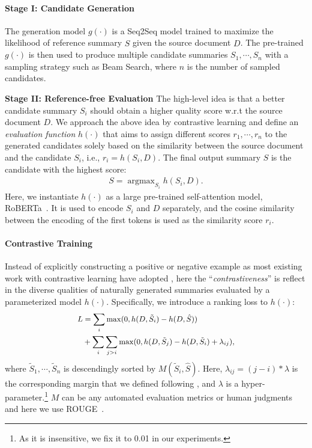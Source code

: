 \documentclass[11pt,a4paper]{article}
\DeclareMathOperator*{\argmax}{argmax}
\begin{document}
\paragraph{Stage I: Candidate Generation}
The generation model $g(\cdot)$ is a Seq2Seq model trained to maximize the likelihood of reference summary $\hat{S}$ given the source document $D$.
The pre-trained $g(\cdot)$ is then used to produce multiple candidate summaries $S_1, \cdots, S_n$ with a sampling strategy such as Beam Search, where $n$ is the number of sampled candidates.

\noindent\textbf{Stage II: Reference-free Evaluation}
The high-level idea is that a better candidate summary $S_i$ should obtain a higher quality score w.r.t the source document $D$.
We approach the above idea by contrastive learning and define an \textit{evaluation function}
$h(\cdot)$ that aims to assign different scores $r_1, \cdots, r_n$ to the generated candidates solely based on the similarity between the source document and the candidate $S_i$, i.e., $r_i = h(S_i, D)$. 
The final output summary $S$ is the candidate with the highest score:
\begin{align}
    S = \argmax_{S_i}h(S_i, D).
\end{align}
Here, we instantiate $h(\cdot)$ as a large pre-trained self-attention model, RoBERTa~\citep{DBLP:journals/corr/abs-1907-11692}. 
It is used to encode $S_i$ and $D$ separately, and the cosine similarity between the encoding of the first tokens is used as the similarity score $r_i$. 

\paragraph{Contrastive Training}
Instead of explicitly constructing a positive or negative example as most existing work with contrastive learning have adopted \citep{chen2020simple,wu-etal-2020-unsupervised}, here the ``\textit{contrastiveness}'' is reflect in the diverse qualities of naturally generated summaries evaluated by a parameterized model $h(\cdot)$.
Specifically, we introduce a ranking loss to $h(\cdot)$:
\begin{equation}
\small
\begin{split}
      L &= \sum_i \max(0, h(D, \tilde{S}_i) - h(D, \hat{S})) \\
     & + \sum_i \sum_{j > i} \max(0, h(D, \tilde{S}_j) - h(D, \tilde{S}_i) + \lambda_{ij}),   \\
\end{split}
\end{equation}
where $\tilde{S}_1, \cdots, \tilde{S}_n$ is descendingly sorted by $M(\tilde{S}_i, \hat{S})$.
Here, $\lambda_{ij} = (j - i) * \lambda$ is the corresponding margin that we defined following \citet{zhong-etal-2020-extractive}, and $\lambda$ is a hyper-parameter.\footnote{As it is insensitive, we fix it to 0.01 in our experiments.}
$M$ can be any automated evaluation metrics or human judgments and here we use ROUGE~\citep{lin-2004-rouge}.
\end{document}
